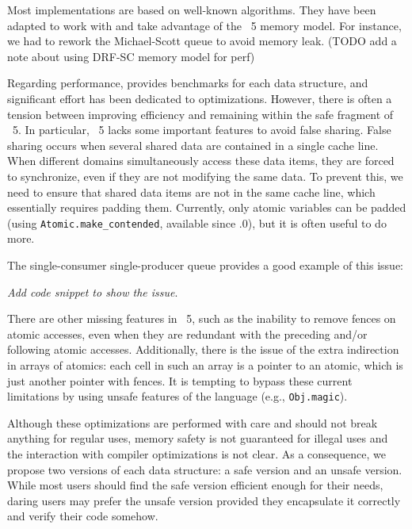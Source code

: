 \documentclass[a4paper, 11pt]{article}
\begin{document}
Most implementations are based on well-known algorithms.
They have been adapted to work with and take advantage of the \OCaml~5 memory model.
For instance, we had to rework the Michael-Scott queue to avoid memory leak.
(TODO add a note about using DRF-SC memory model for perf)

Regarding performance, \Saturn provides benchmarks for each data structure, and significant effort has been dedicated to optimizations.
However, there is often a tension between improving efficiency and remaining within the safe fragment of \OCaml~5.
In particular, \OCaml~5 lacks some important features to avoid false sharing.
False sharing occurs when several shared data are contained in a single cache line.
When different domains simultaneously access these data items, they are forced to synchronize, even if they are not modifying the same data.
To prevent this, we need to ensure that shared data items are not in the same cache line, which essentially requires padding them.
Currently, only atomic variables can be padded (using \texttt{Atomic.make\_contended}, available since .0), but it is often useful to do more. 

The single-consumer single-producer queue provides a good example of this issue: 

\emph{Add code snippet to show the issue}.

There are other missing features in \OCaml~5, such as the inability to remove fences on atomic accesses, even when they are redundant with the preceding and/or following atomic accesses.
Additionally, there is the issue of the extra indirection in arrays of atomics: each cell in such an array is a pointer to an atomic, which is just another pointer with fences.
It is tempting to bypass these current limitations by using unsafe features of the language (e.g., \texttt{Obj.magic}).

Although these optimizations are performed with care and should not break anything for regular uses, memory safety is not guaranteed for illegal uses and the interaction with compiler optimizations is not clear.
As a consequence, we propose two versions of each data structure: a safe version and an unsafe version.
While most users should find the safe version efficient enough for their needs, daring users may prefer the unsafe version provided they encapsulate it correctly and verify their code somehow.

\end{document}
